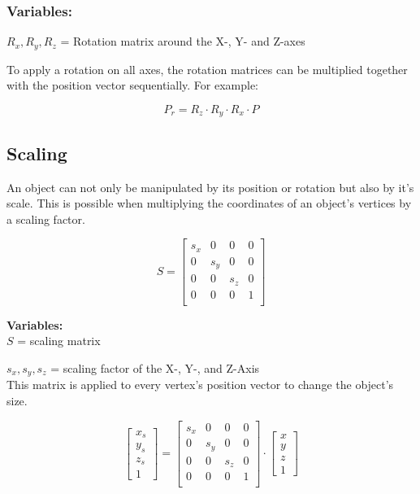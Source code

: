 \subsubsection{Variables: }
$R_x, R_y, R_z$ = Rotation matrix around the X-, Y- and Z-axes

To apply a rotation on all axes, the rotation matrices can be multiplied together with the position vector sequentially. For example:

\[
P_r = R_z \cdot R_y  \cdot R_x \cdot P
\]



\subsection{Scaling}
An object can not only be manipulated by its position or rotation but also by it's scale. This is possible when multiplying the coordinates of an object's vertices by a scaling factor.

\[
S = 
\begin{bmatrix}
s_x & 0 & 0 & 0 \\
0 & s_y & 0 & 0 \\
0 & 0 & s_z & 0 \\
0 & 0 & 0 & 1 \\
\end{bmatrix}
\]

\textbf{Variables: } \\
$S$ = scaling matrix

$s_x, s_y, s_z$ = scaling factor of the X-, Y-, and Z-Axis \\

This matrix is applied to every vertex's position vector to change the object's size.

\[
\begin{bmatrix}
x_s \\
y_s \\
z_s \\
1
\end{bmatrix}
 = 
\begin{bmatrix}
s_x & 0 & 0 & 0 \\
0 & s_y & 0 & 0 \\
0 & 0 & s_z & 0 \\
0 & 0 & 0 & 1 \\
\end{bmatrix}
\cdot
\begin{bmatrix}
x \\
y \\
z \\
1
\end{bmatrix}
\]

